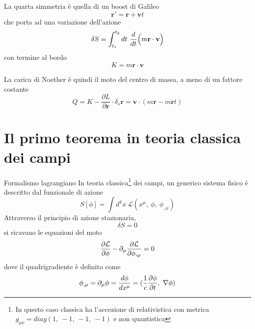 \begin{frame}  

    La quarta simmetria è quella di un boost di Galileo
    \begin{equation*}
        \mathbf r' = \mathbf r + \mathbf v t
    \end{equation*}
    che porta ad una variazione dell'azione
    \begin{equation*}
        \delta S = \int_{t_1}^{t_2}dt~ \frac{d}{dt} \Big( m \mathbf r \cdot \mathbf v \Big) 
    \end{equation*}
    con termine al bordo 
    \begin{equation*}
        K = m \mathbf r \cdot \mathbf v 
    \end{equation*}
    
    La carica di Noether è quindi il moto del centro di massa, a meno di un fattore costante
    \begin{equation*}
        Q = K - \frac{\partial L}{\partial  \mathbf{\dot r}} \cdot \delta_s \mathbf r = \mathbf v \cdot (m \mathbf r - m \mathbf{\dot r} t)
    \end{equation*}

\end{frame}

\section{Il primo teorema in teoria classica dei campi}

\begin{frame}{Formalismo lagrangiano}
    In teoria classica\footnote{In questo caso classica ha l'accezione di relativistica con metrica $g_{\mu\nu} = diag(1,~-1,~-1,~-1)$ e non quantistica} dei campi, un generico sistema fisico è descritto dal funzionale di azione
    \begin{equation*}
        S[\phi] = \int d^4 x ~ \mathcal L (x^\mu,~\phi,~\phi_{, \mu})
    \end{equation*} 
    Attraverso il principio di azione stazionaria,
    \begin{equation*}
        \delta S = 0
    \end{equation*}
    si ricavano le equazioni del moto 
    \begin{equation*}
        \frac{\partial\mathcal L}{\partial\phi} - \partial_\mu \frac{\partial\mathcal L}{\partial\phi,_\mu} = 0
    \end{equation*} 
    dove il quadrigradiente è definito come
    \begin{equation*}
        \phi_{, \mu} = \partial_\mu \phi = \frac{d\phi}{dx^\mu} = (\frac{1}{c} \frac{\partial\phi}{\partial t}, ~ \nabla \phi)
    \end{equation*} 
\end{frame}

